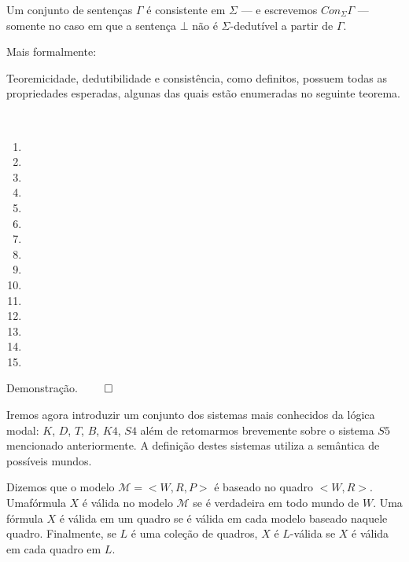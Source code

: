 Um conjunto de sentenças $\Gamma$ é consistente em $\Sigma$ --- e escrevemos
$Con_{\Sigma}\Gamma$ --- somente no caso em que a sentença $\bot$ não é
$\Sigma$-dedutível a partir de $\Gamma$.

Mais formalmente:

\begin{definition}[Dedutibilidade]
    
\end{definition}

\begin{definition}[Consistência]
    
\end{definition}

Teoremicidade, dedutibilidade e consistência, como definitos, possuem todas as
propriedades esperadas, algunas das quais estão enumeradas no seguinte teorema.

\begin{theorem} ~
    \begin{enumerate}
        \item 
        \item 
        \item 
        \item 
        \item 
        \item 
        \item 
        \item 
        \item 
        \item 
        \item 
        \item 
        \item 
        \item 
        \item 
    \end{enumerate}
\end{theorem}

Demonstração. $\qed$

Iremos agora introduzir um conjunto dos sistemas mais conhecidos da lógica
modal: $K$, $D$, $T$, $B$, $K4$, $S4$ além de retomarmos brevemente sobre o
sistema $S5$ mencionado anteriormente. A definição destes sistemas utiliza a
semântica de possíveis mundos.

\begin{definition}[$L$-Válida]
    Dizemos que o modelo $\mathcal{M} = <W, R, P>$ é baseado no quadro $<W,R>$.
    Umafórmula $X$ é válida no modelo $\mathcal{M}$ se é verdadeira em todo
    mundo de $W$. Uma fórmula $X$ é válida em um quadro se é válida em cada
    modelo baseado naquele quadro. Finalmente, se $L$ é uma coleção de quadros,
    $X$ é $L$-válida se $X$ é válida em cada quadro em $L$.
\end{definition}

